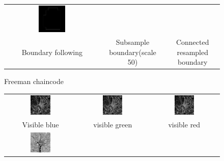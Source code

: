 \documentclass[11pt,a4paper]{article}
\begin{document}
\begin{figure}[!b]
\begin{tabular}{ccc}
		\includegraphics[width=0.3\textwidth]{pro10/chaincode/11_5_f}\\
		Boundary following & Subsample boundary(scale 50)& Connected resampled boundary
	\end{tabular}
	\caption{Freeman chaincode}
	\label{pro10_fig1}
\end{figure}

\begin{figure}[!htbp]
	\centering
	\begin{tabular}{ccc} 
		\includegraphics[width=0.3\textwidth]{pro10/PC/11_38_a}&
		\includegraphics[width=0.3\textwidth]{pro10/PC/11_38_b}&
		\includegraphics[width=0.3\textwidth]{pro10/PC/11_38_c}\\
		 Visible blue & visible green  & visible red\\
		\includegraphics[width=0.3\textwidth]{pro10/PC/11_38_d}&

\end{tabular}
\end{figure}
\end{document}
